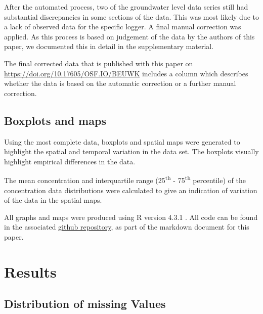 \documentclass[, manuscript]{copernicus}
\begin{document}
After the automated process, two of the groundwater level data series
still had substantial discrepancies in some sections of the data. This
was most likely due to a lack of observed data for the specific logger.
A final manual correction was applied. As this process is based on
judgement of the data by the authors of this paper, we documented this
in detail in the supplementary material.

The final corrected data that is published with this paper on
\url{https://doi.org/10.17605/OSF.IO/BEUWK} includes a column which
describes whether the data is based on the automatic correction or a
further manual correction.

\clearpage

\subsection{Boxplots and maps}

Using the most complete data, boxplots and spatial maps were generated
to highlight the spatial and temporal variation in the data set. The
boxplots visually highlight empirical differences in the data.

The mean concentration and interquartile range (25\textsuperscript{th} -
75\textsuperscript{th} percentile) of the concentration data
distributions were calculated to give an indication of variation of the
data in the spatial maps.

All graphs and maps were produced using R version 4.3.1 \citep{R2023}.
All code can be found in the associated
\href{https://github.com/WillemVervoort/MuttamaDataPaper}{github
repository}, as part of the markdown document for this paper.

\section{Results}

\subsection{Distribution of missing Values}
\end{document}
